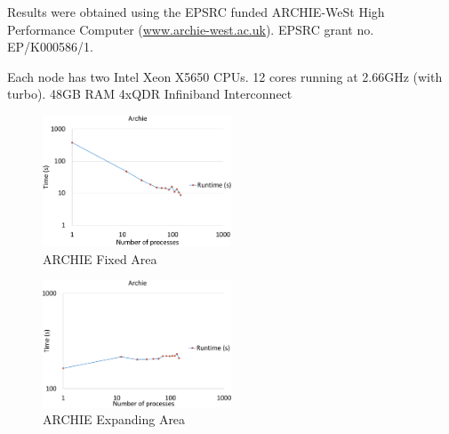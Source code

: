 Results were obtained using the EPSRC funded ARCHIE-WeSt High Performance
Computer (\url{www.archie-west.ac.uk}). EPSRC grant no. EP/K000586/1.

Each node has two Intel Xeon X5650 CPUs. 12 cores running at 2.66GHz (with
turbo). 48GB RAM 4xQDR Infiniband Interconnect

\begin{figure}
    \includegraphics[page=1,width=0.5\textwidth]
    {graphs/ARCHIE-OpenMPI162-GFORTRAN482-default-mapping-fixed-area-crop.pdf}
    \caption{ARCHIE Fixed Area}
    \label{fig:archiefixedarea}
\end{figure}

\begin{figure}
    \includegraphics[page=1,width=0.5\textwidth]
    {graphs/ARCHIE-OpenMPI162-GFORTRAN482-default-mapping-expanding-area-crop.pdf}
    \caption{ARCHIE Expanding Area}
    \label{fig:archieexpandingarea}
\end{figure}
